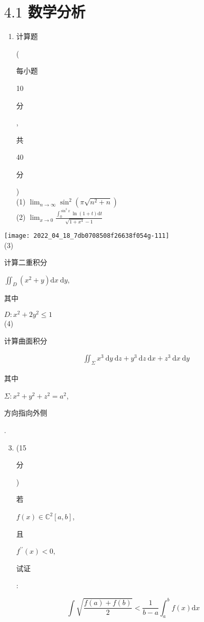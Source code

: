 \documentclass[10pt]{article}
\begin{document}
\section{$4.1$ 数学分析}
\begin{enumerate}
  \item \begin{CJK}{UTF8}{mj}计算题\end{CJK} (\begin{CJK}{UTF8}{mj}每小题\end{CJK} 10 \begin{CJK}{UTF8}{mj}分\end{CJK}, \begin{CJK}{UTF8}{mj}共\end{CJK} 40 \begin{CJK}{UTF8}{mj}分\end{CJK})\\
(1) $\lim _{n \rightarrow \infty} \sin ^{2}\left(\pi \sqrt{n^{2}+n}\right)$\\
(2) $\lim _{x \rightarrow 0} \frac{\int_{0}^{\sin ^{2} x} \ln (1+t) \mathrm{d} t}{\sqrt{1+x^{4}}-1}$
\end{enumerate}
\texttt{[image: 2022\_04\_18\_7db0708508f26638f054g-111]}\\
(3) \begin{CJK}{UTF8}{mj}计算二重积分\end{CJK} $\iint_{D}\left(x^{2}+y\right) \mathrm{d} x \mathrm{~d} y$, \begin{CJK}{UTF8}{mj}其中\end{CJK} $D: x^{2}+2 y^{2} \leq 1$\\
(4) \begin{CJK}{UTF8}{mj}计算曲面积分\end{CJK}
$$
\begin{aligned}
& \iint_{\Sigma} x^{3} \mathrm{~d} y \mathrm{~d} z+y^{3} \mathrm{~d} z \mathrm{~d} x+z^{3} \mathrm{~d} x \mathrm{~d} y
\end{aligned}
$$
\begin{CJK}{UTF8}{mj}其中\end{CJK} $\Sigma: x^{2}+y^{2}+z^{2}=a^{2}$, \begin{CJK}{UTF8}{mj}方向指向外侧\end{CJK}.

\begin{enumerate}
  \setcounter{enumi}{2}
  \item (15 \begin{CJK}{UTF8}{mj}分\end{CJK}) \begin{CJK}{UTF8}{mj}若\end{CJK} $f(x) \in \mathbb{C}^{2}[a, b]$, \begin{CJK}{UTF8}{mj}且\end{CJK} $f^{\prime \prime}(x)<0$, \begin{CJK}{UTF8}{mj}试证\end{CJK}:
\end{enumerate}
$$
\int \sqrt{\frac{f(a)+f(b)}{2}}<\frac{1}{b-a} \int_{a}^{b} f(x) \mathrm{d} x
$$
\end{document}
